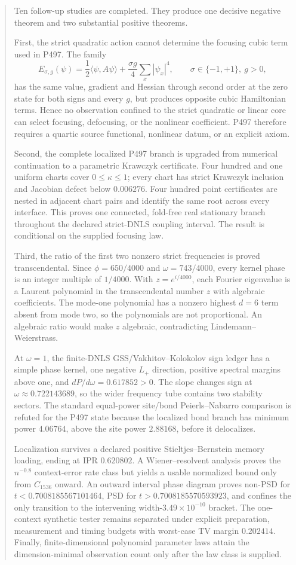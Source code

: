 \documentclass[11pt,a4paper]{article}
\theoremstyle{definition}
\theoremstyle{remark}
\begin{document}
\begin{abstract}
Ten follow-up studies are completed. They produce one decisive negative theorem and two substantial positive theorems.

First, the strict quadratic action cannot determine the focusing cubic term used in P497. The family
\[
 E_{\sigma,g}(\psi)=\frac12\langle\psi,A\psi\rangle+\frac{\sigma g}{4}\sum_x|\psi_x|^4,
 \qquad \sigma\in\{-1,+1\},\ g>0,
\]
has the same value, gradient and Hessian through second order at the zero state for both signs and every $g$, but produces opposite cubic Hamiltonian terms. Hence no observation confined to the strict quadratic or linear core can select focusing, defocusing, or the nonlinear coefficient. P497 therefore requires a quartic source functional, nonlinear datum, or an explicit axiom.

Second, the complete localized P497 branch is upgraded from numerical continuation to a parametric Krawczyk certificate. Four hundred and one uniform charts cover $0\le\kappa\le1$; every chart has strict Krawczyk inclusion and Jacobian defect below $0.006276$. Four hundred point certificates are nested in adjacent chart pairs and identify the same root across every interface. This proves one connected, fold-free real stationary branch throughout the declared strict-DNLS coupling interval. The result is conditional on the supplied focusing law.

Third, the ratio of the first two nonzero strict frequencies is proved transcendental. Since $\phi=650/4000$ and $\omega=743/4000$, every kernel phase is an integer multiple of $1/4000$. With $z=e^{i/4000}$, each Fourier eigenvalue is a Laurent polynomial in the transcendental number $z$ with algebraic coefficients. The mode-one polynomial has a nonzero highest $d=6$ term absent from mode two, so the polynomials are not proportional. An algebraic ratio would make $z$ algebraic, contradicting Lindemann--Weierstrass.

At $\omega=1$, the finite-DNLS GSS/Vakhitov--Kolokolov sign ledger has a simple phase kernel, one negative $L_+$ direction, positive spectral margins above one, and $dP/d\omega=0.617852>0$. The slope changes sign at $\omega\approx0.722143689$, so the wider frequency tube contains two stability sectors. The standard equal-power site/bond Peierls--Nabarro comparison is refuted for the P497 state because the localized bond branch has minimum power $4.06764$, above the site power $2.88168$, before it delocalizes.

Localization survives a declared positive Stieltjes--Bernstein memory loading, ending at IPR $0.620802$. A Wiener--resolvent analysis proves the $n^{-0.8}$ context-error rate class but yields a usable normalized bound only from $C_{1536}$ onward. An outward interval phase diagram proves non-PSD for $t<0.7008185567101464$, PSD for $t>0.7008185570593923$, and confines the only transition to the intervening width-$3.49\times10^{-10}$ bracket. The one-context synthetic tester remains separated under explicit preparation, measurement and timing budgets with worst-case TV margin $0.202414$. Finally, finite-dimensional polynomial parameter laws attain the dimension-minimal observation count only after the law class is supplied.


\end{abstract}
\end{document}
